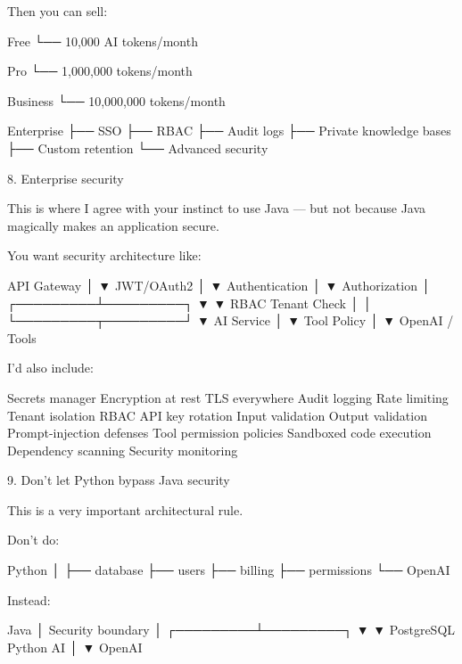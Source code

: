 Then you can sell:

Free
 └── 10,000 AI tokens/month

Pro
 └── 1,000,000 tokens/month

Business
 └── 10,000,000 tokens/month

Enterprise
 ├── SSO
 ├── RBAC
 ├── Audit logs
 ├── Private knowledge bases
 ├── Custom retention
 └── Advanced security

8. Enterprise security

This is where I agree with your instinct to use Java — but not because Java magically makes an application secure.

You want security architecture like:

                    API Gateway
                         │
                         ▼
                    JWT/OAuth2
                         │
                         ▼
                  Authentication
                         │
                         ▼
                  Authorization
                         │
               ┌─────────┴─────────┐
               ▼                   ▼
             RBAC              Tenant Check
               │                   │
               └─────────┬─────────┘
                         ▼
                    AI Service
                         │
                         ▼
                    Tool Policy
                         │
                         ▼
                   OpenAI / Tools

I'd also include:

    Secrets manager
    Encryption at rest
    TLS everywhere
    Audit logging
    Rate limiting
    Tenant isolation
    RBAC
    API key rotation
    Input validation
    Output validation
    Prompt-injection defenses
    Tool permission policies
    Sandboxed code execution
    Dependency scanning
    Security monitoring

9. Don't let Python bypass Java security

This is a very important architectural rule.

Don't do:

Python
  │
  ├── database
  ├── users
  ├── billing
  ├── permissions
  └── OpenAI

Instead:

                 Java
                  │
          Security boundary
                  │
        ┌─────────┴─────────┐
        ▼                   ▼
    PostgreSQL          Python AI
                            │
                            ▼
                         OpenAI


